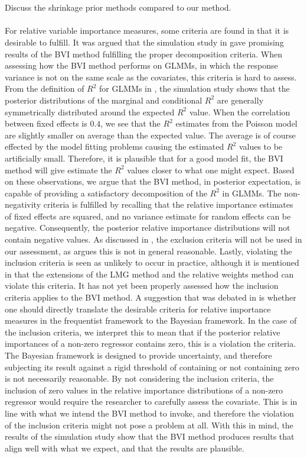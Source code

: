 \\
\\
Discuss the shrinkage prior methods compared to our method.
\\
\\
For relative variable importance measures, some criteria are found in  that it is desirable to fulfill. It was argued that the simulation study in \citet{Arnstad} gave promising results of the BVI method fulfilling the proper decomposition criteria. When assessing how the BVI method performs on GLMMs, in which the response variance is not on the same scale as the covariates, this criteria is hard to assess. From the definition of $R^2$ for GLMMs in \citet{nakagawa2013general}, the simulation study shows that the posterior distributions of the marginal and conditional $R^2$ are generally symmetrically distributed around the expected $R^2$ value. When the correlation between fixed effects is $0.4$, we see that the $R^2$ estimates from the Poisson model are slightly smaller on average than the expected value. The average is of course effected by the model fitting problems causing the estimated $R^2$ values to be artificially small. Therefore, it is plausible that for a good model fit, the BVI method will give estimate the $R^2$ values closer to what one might expect. Based on these observations, we argue that the BVI method, in posterior expectation, is capable of providing a satisfactory decomposition of the $R^2$ in GLMMs. The non-negativity criteria is fulfilled by recalling that the relative importance estimates of fixed effects are squared, and no variance estimate for random effects can be negative. Consequently, the posterior relative importance distributions will not contain negative values. As discussed in \citet{Arnstad}, the exclusion criteria will not be used in our assessment, as \citet{gromping_relaimpo} argues this is not in general reasonable. Lastly, violating  the inclusion criteria is seen as unlikely to occur in practice, although it is mentioned in \citet{matre} that the extensions of the LMG method and the relative weights method can violate this criteria. It has not yet been properly assessed how the inclusion criteria applies to the BVI method. A suggestion that was debated in \citep{Arnstad} is whether one should directly translate the desirable criteria for relative importance measures in the frequentist framework to the Bayesian framework. In the case of the inclusion criteria, we interpret this to mean that if the posterior relative importances of a non-zero regressor contains zero, this is a violation the criteria. The Bayesian framework is designed to provide uncertainty, and therefore subjecting its result against a rigid threshold of containing or not containing zero is not necessarily reasonable. By not considering the inclusion criteria, the inclusion of zero values in the relative importance distributions of a non-zero regressor would require the researcher to carefully assess the covariate. This is in line with what we intend the BVI method to invoke, and therefore the violation of the inclusion criteria might not pose a problem at all. With this in mind, the results of the simulation study show that the BVI method produces results that align well with what we expect, and that the results are plausible. 
